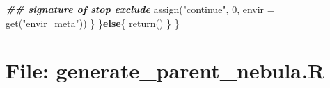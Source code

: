 \documentclass[
]{article}
\newenvironment{Shaded}{\begin{snugshade}}{\end{snugshade}}
\newcommand{\AttributeTok}[1]{\textcolor[rgb]{0.77,0.63,0.00}{#1}}
\newcommand{\ControlFlowTok}[1]{\textcolor[rgb]{0.13,0.29,0.53}{\textbf{#1}}}
\newcommand{\DecValTok}[1]{\textcolor[rgb]{0.00,0.00,0.81}{#1}}
\newcommand{\DocumentationTok}[1]{\textcolor[rgb]{0.56,0.35,0.01}{\textbf{\textit{#1}}}}
\newcommand{\FunctionTok}[1]{\textcolor[rgb]{0.00,0.00,0.00}{#1}}
\newcommand{\NormalTok}[1]{#1}
\newcommand{\StringTok}[1]{\textcolor[rgb]{0.31,0.60,0.02}{#1}}
\begin{document}
\begin{Shaded}
\begin{Highlighting}[]
        \DocumentationTok{\#\# signature of stop exclude}
        \FunctionTok{assign}\NormalTok{(}\StringTok{"continue"}\NormalTok{, }\DecValTok{0}\NormalTok{, }\AttributeTok{envir =} \FunctionTok{get}\NormalTok{(}\StringTok{"envir\_meta"}\NormalTok{))}
\NormalTok{      \}}
\NormalTok{    \}}\ControlFlowTok{else}\NormalTok{\{}
      \FunctionTok{return}\NormalTok{()}
\NormalTok{    \}}
\NormalTok{  \}}
\end{Highlighting}
\end{Shaded}

\hypertarget{file-generate_parent_nebula.r}{%
\section{File: generate\_parent\_nebula.R}\label{file-generate_parent_nebula.r}}
\end{document}
